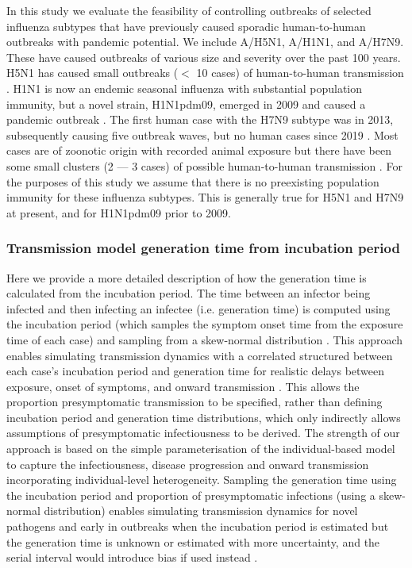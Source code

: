 \documentclass{article}
\begin{document}
In this study we evaluate the feasibility of controlling outbreaks of selected influenza subtypes that have previously caused sporadic human-to-human outbreaks with pandemic potential. We include A/H5N1, A/H1N1, and A/H7N9. These have caused outbreaks of various size and severity over the past 100 years. H5N1 has caused small outbreaks ($<$ 10 cases) of human-to-human transmission \citep{yangDetectingHumanhumanTransmission2007a, aditamaAvianInfluenzaH5N12012a}. H1N1 is now an endemic seasonal influenza with substantial population immunity, but a novel strain, H1N1pdm09, emerged in 2009 and caused a pandemic outbreak \citep{fraserPandemicPotentialStrain2009, lesslerOutbreak2009Pandemic2009}. The first human case with the H7N9 subtype was in 2013, subsequently causing five outbreak waves, but no human cases since 2019 \citep{liH7N9InfluenzaVirus2021}. Most cases are of zoonotic origin with recorded animal exposure but there have been some small clusters (2 --- 3 cases) of possible human-to-human transmission \citep{liEpidemiologyHumanInfections2014}. For the purposes of this study we assume that there is no preexisting population immunity for these influenza subtypes. This is generally true for H5N1 and H7N9 at present, and for H1N1pdm09 prior to 2009.

\subsubsection*{Transmission model generation time from incubation period}

Here we provide a more detailed description of how the generation time is calculated from the incubation period. The time between an infector being infected and then infecting an infectee (i.e. generation time) is computed using the incubation period (which samples the symptom onset time from the exposure time of each case) and sampling from a skew-normal distribution \citep{azzaliniClassDistributionsWhich1985}. This approach enables simulating transmission dynamics with a correlated structured between each case's incubation period and generation time for realistic delays between exposure, onset of symptoms, and onward transmission \citep{hellewellFeasibilityControllingCOVID192020, lintonCorrelationTimesSARSCoV22022}. This allows the proportion presymptomatic transmission to be specified, rather than defining incubation period and generation time distributions, which only indirectly allows assumptions of presymptomatic infectiousness to be derived. The strength of our approach is based on the simple parameterisation of the individual-based model to capture the infectiousness, disease progression and onward transmission incorporating individual-level heterogeneity. Sampling the generation time using the incubation period and proportion of presymptomatic infections (using a skew-normal distribution) enables simulating transmission dynamics for novel pathogens and early in outbreaks when the incubation period is estimated but the generation time is unknown or estimated with more uncertainty, and the serial interval would introduce bias if used instead \citep{brittonEstimationEmergingEpidemics2019a, lehtinenRelationshipSerialInterval2021}. \\
\end{document}
